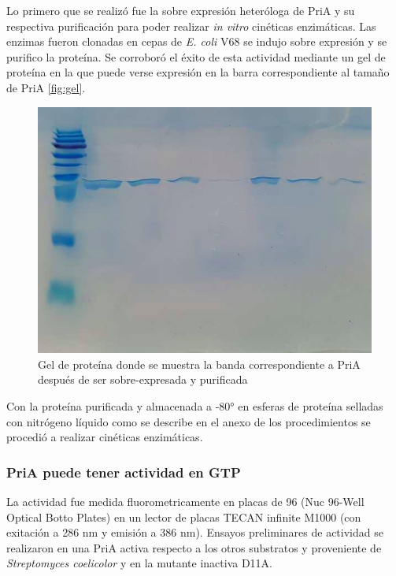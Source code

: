 \documentclass[]{article}
\begin{document}
{Lo primero que se realizó fue la sobre expresión heteróloga de PriA y su
respectiva purificación para poder realizar \emph{in vitro} cinéticas
enzimáticas. Las enzimas fueron clonadas en cepas de \emph{E. coli} V68
se indujo sobre expresión y se purifico la proteína. Se corroboró el
éxito de esta actividad mediante un gel de proteína en la que puede
verse expresión en la barra correspondiente al tamaño de PriA
\autoref{fig:gel}.

\begin{figure}[h!tbp]
\centering
\includegraphics[angle = 0,scale = 0.6]{chapter4/Geles/PriAAbril30.png}
\caption[gel]{\footnotesize{Gel de proteína donde se muestra la banda correspondiente a PriA después de ser sobre-expresada y purificada}}
\label{fig:gel}
\end{figure}

Con la proteína purificada y almacenada a -80° en esferas de proteína
selladas con nitrógeno líquido como se describe en el anexo de los
procedimientos se procedió a realizar cinéticas enzimáticas.

\subsubsection{PriA puede tener actividad en
GTP}\label{pria-puede-tener-actividad-en-gtp}

La actividad fue medida fluorometricamente en placas de 96 (Nuc 96-Well
Optical Botto Plates) en un lector de placas TECAN infinite M1000 (con
exitación a 286 nm y emisión a 386 nm). Ensayos preliminares de
actividad se realizaron en una PriA activa respecto a los otros
substratos y proveniente de \emph{Streptomyces coelicolor} y en la
mutante inactiva D11A.

}
\end{document}
